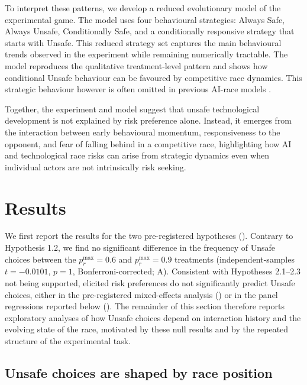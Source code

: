 \documentclass[pdflatex,sn-mathphys-ay]{sn-jnl}
\theoremstyle{thmstyleone}
\theoremstyle{thmstyletwo}
\theoremstyle{thmstylethree}
\begin{document}
To interpret these patterns, we develop a reduced evolutionary model of the experimental game. The model uses four behavioural strategies: Always Safe, Always Unsafe, Conditionally Safe, and a conditionally responsive strategy that starts with Unsafe. This reduced strategy set captures the main behavioural trends observed in the experiment while remaining numerically tractable. The model reproduces the qualitative treatment-level pattern and shows how conditional Unsafe behaviour can be favoured by competitive race dynamics. This strategic behaviour however is often omitted in previous AI-race models \citep{han2020toRegulateOrNot,HanEtAl2021MediatingAI,CimpeanuEtAl2022AIRacesHeterogeneous}.

Together, the experiment and model suggest that unsafe technological development is not explained by risk preference alone. Instead, it emerges from the interaction between early behavioural momentum, responsiveness to the opponent, and fear of falling behind in a competitive race, highlighting how AI and technological race risks can arise from strategic dynamics even when individual actors are not intrinsically risk seeking.

\section{Results}\label{sec:results}

We first report the results for the two pre-registered hypotheses (). Contrary to Hypothesis 1.2, we find no significant difference in the frequency of Unsafe choices between the $p_r^{\max}=0.6$ and $p_r^{\max}=0.9$ treatments (independent-samples $t=-0.0101$, $p=1$, Bonferroni-corrected; A). Consistent with Hypotheses 2.1--2.3 not being supported, elicited risk preferences do not significantly predict Unsafe choices, either in the pre-registered mixed-effects analysis () or in the panel regressions reported below (). The remainder of this section therefore reports exploratory analyses of how Unsafe choices depend on interaction history and the evolving state of the race, motivated by these null results and by the repeated structure of the experimental task.

\subsection*{Unsafe choices are shaped by race position}
\end{document}
